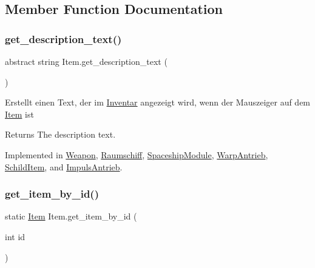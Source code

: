\subsection{Member Function Documentation}
\mbox{\label{class_item_ab868f8ccad92378f7352e3a9e0f755ff}} 
\subsubsection{\texorpdfstring{get\+\_\+description\+\_\+text()}{get\_description\_text()}}
{\footnotesize\ttfamily abstract string Item.\+get\+\_\+description\+\_\+text (\begin{DoxyParamCaption}{ }\end{DoxyParamCaption})\hspace{0.3cm}{\ttfamily [pure virtual]}}



Erstellt einen Text, der im \hyperlink{class_inventar}{Inventar} angezeigt wird, wenn der Mauszeiger auf dem \hyperlink{class_item}{Item} ist 

\begin{DoxyReturn}{Returns}
The description text.
\end{DoxyReturn}


Implemented in \hyperlink{class_weapon_a8fcfb4f08ea22a8fc60790770a58b985}{Weapon}, \hyperlink{class_raumschiff_a9aa65a7d3deb846709b85be4d157d621}{Raumschiff}, \hyperlink{class_spaceship_module_a787019cbebc400d17dc7233ca315c6da}{Spaceship\+Module}, \hyperlink{class_warp_antrieb_a6fab9b91e972d0411541b2a2ff89a21e}{Warp\+Antrieb}, \hyperlink{class_schild_item_a6e09e58ec5afc082636c1a9b4b715613}{Schild\+Item}, and \hyperlink{class_impuls_antrieb_ad9c1cf88503eecd20366493ac6f6b855}{Impuls\+Antrieb}.

\mbox{\label{class_item_a434d366123e8cde420cd08d6d55cf2e2}} 
\subsubsection{\texorpdfstring{get\+\_\+item\+\_\+by\+\_\+id()}{get\_item\_by\_id()}}
{\footnotesize\ttfamily static \hyperlink{class_item}{Item} Item.\+get\+\_\+item\+\_\+by\+\_\+id (\begin{DoxyParamCaption}\item[{int}]{id }\end{DoxyParamCaption})\hspace{0.3cm}{\ttfamily [static]}}



